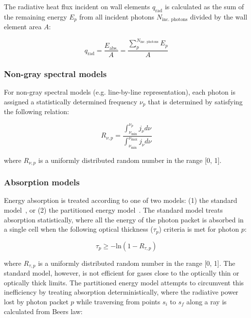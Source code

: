 The radiative heat flux incident on wall elements $q_\text{rad}$ is calculated as the sum of the remaining energy $E_{p}$ from all incident photons $N_\text{inc. photons}$ divided by the wall element area $A$:

\begin{equation}
 q_\text{rad} = \frac{ E_\text{abs.} }{A} =  \frac{ \displaystyle \sum_{p}^{N_{\text{inc. photons}}} \displaystyle E_{p} }{ A }
 \label{eq:my_divq}
\end{equation}

\subsubsection{Non-gray spectral models}

For non-gray spectral models (e.g. line-by-line representation), each photon is assigned a statistically determined frequency $\nu_p$ that is determined by satisfying the following relation:

\begin{equation}
R_{\nu,p} = \frac{\int_{\nu_{\text{min}}}^{\nu_p} j_{\nu} d \nu}{\int_{\nu_{\text{min}}}^{\nu_{\text{max}}} j_{\nu} d \nu}
\end{equation}

\noindent where $R_{\nu,p}$ is a uniformly distributed random number in the range [0, 1].

\subsubsection{Absorption models}

Energy absorption is treated according to one of two models:  (1) the standard model~\cite{Mod03}, or (2) the partitioned energy model~\cite{MP77}.
The standard model treats absorption statistically, where all the energy of the photon packet is absorbed in a single cell when the following optical thickness ($\tau_p$) criteria is met for photon $p$:

\begin{equation}
 \tau_p \geq - \text{ln} \left ( 1 - R_{\tau,p} \right ) 
\end{equation}

\noindent where $R_{\tau,p}$ is a uniformly distributed random number in the range [0, 1].
The standard model, however, is not efficient for gases close to the optically thin or optically thick limits.
The partitioned energy model attempts to circumvent this inefficiency by treating absorption deterministically, where the radiative power lost by photon packet $p$ while traversing from points $s_{i}$ to $s_{f}$ along a ray is calculated from Beers law:

